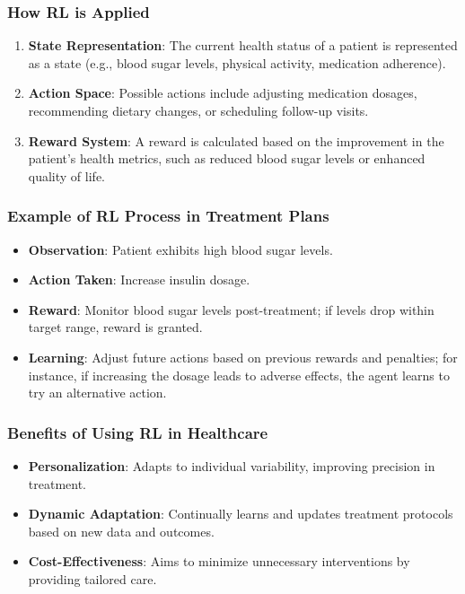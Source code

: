 \documentclass[aspectratio=169]{beamer}
\begin{document}
\begin{frame}[fragile]
  \frametitle{How RL is Applied}
  \begin{enumerate}
      \item \textbf{State Representation}: The current health status of a patient is represented as a state (e.g., blood sugar levels, physical activity, medication adherence).
      \item \textbf{Action Space}: Possible actions include adjusting medication dosages, recommending dietary changes, or scheduling follow-up visits.
      \item \textbf{Reward System}: A reward is calculated based on the improvement in the patient's health metrics, such as reduced blood sugar levels or enhanced quality of life.
  \end{enumerate}
\end{frame}

\begin{frame}[fragile]
  \frametitle{Example of RL Process in Treatment Plans}
  
  \begin{itemize}
      \item \textbf{Observation}: Patient exhibits high blood sugar levels.
      \item \textbf{Action Taken}: Increase insulin dosage.
      \item \textbf{Reward}: Monitor blood sugar levels post-treatment; if levels drop within target range, reward is granted.
      \item \textbf{Learning}: Adjust future actions based on previous rewards and penalties; for instance, if increasing the dosage leads to adverse effects, the agent learns to try an alternative action.
  \end{itemize}
\end{frame}

\begin{frame}[fragile]
  \frametitle{Benefits of Using RL in Healthcare}
  \begin{itemize}
      \item \textbf{Personalization}: Adapts to individual variability, improving precision in treatment.
      \item \textbf{Dynamic Adaptation}: Continually learns and updates treatment protocols based on new data and outcomes.
      \item \textbf{Cost-Effectiveness}: Aims to minimize unnecessary interventions by providing tailored care.
  \end{itemize}
\end{frame}
\end{document}
